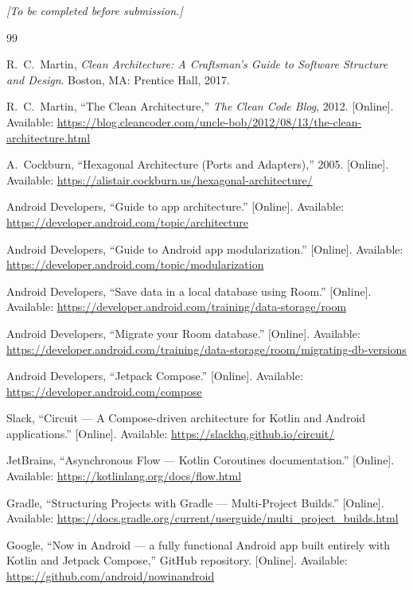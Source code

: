 \documentclass[11pt,a4paper]{article}
\begin{document}
\textit{[To be completed before submission.]}

\begin{thebibliography}{99}

R.~C.~Martin, \emph{Clean Architecture: A Craftsman's Guide to Software
Structure and Design}. Boston, MA: Prentice Hall, 2017.

R.~C.~Martin, ``The Clean Architecture,'' \emph{The Clean Code Blog}, 2012.
[Online]. Available:
\url{https://blog.cleancoder.com/uncle-bob/2012/08/13/the-clean-architecture.html}

A.~Cockburn, ``Hexagonal Architecture (Ports and Adapters),'' 2005. [Online].
Available: \url{https://alistair.cockburn.us/hexagonal-architecture/}

Android Developers, ``Guide to app architecture.'' [Online]. Available:
\url{https://developer.android.com/topic/architecture}

Android Developers, ``Guide to Android app modularization.'' [Online]. Available:
\url{https://developer.android.com/topic/modularization}

Android Developers, ``Save data in a local database using Room.'' [Online].
Available: \url{https://developer.android.com/training/data-storage/room}

Android Developers, ``Migrate your Room database.'' [Online]. Available:
\url{https://developer.android.com/training/data-storage/room/migrating-db-versions}

Android Developers, ``Jetpack Compose.'' [Online]. Available:
\url{https://developer.android.com/compose}

Slack, ``Circuit --- A Compose-driven architecture for Kotlin and Android
applications.'' [Online]. Available: \url{https://slackhq.github.io/circuit/}

JetBrains, ``Asynchronous Flow --- Kotlin Coroutines documentation.'' [Online].
Available: \url{https://kotlinlang.org/docs/flow.html}

Gradle, ``Structuring Projects with Gradle --- Multi-Project Builds.'' [Online].
Available: \url{https://docs.gradle.org/current/userguide/multi_project_builds.html}

Google, ``Now in Android --- a fully functional Android app built entirely with
Kotlin and Jetpack Compose,'' GitHub repository. [Online]. Available:
\url{https://github.com/android/nowinandroid}

\end{thebibliography}
\end{document}
